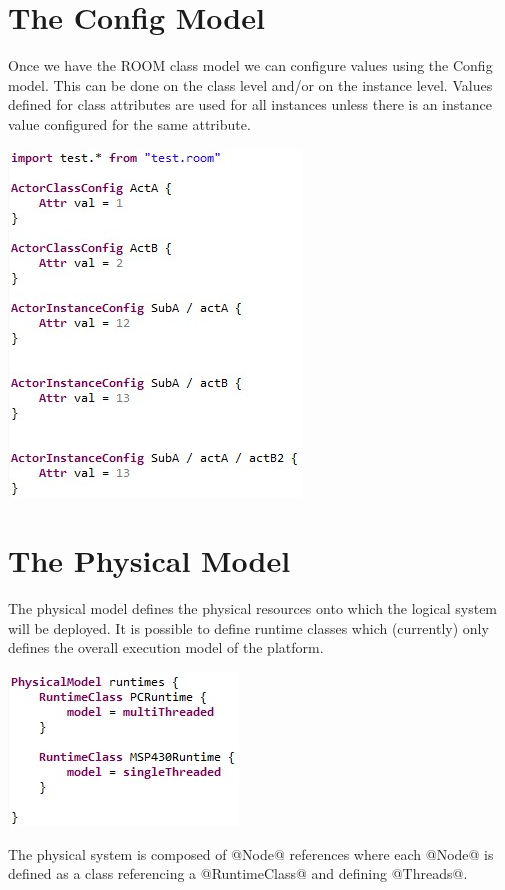 \section{The Config Model}

Once we have the ROOM class model we can configure values using the Config model. This can be done on the 
class level and/or on the instance level. Values defined for class attributes are used for all instances 
unless there is an instance value configured for the same attribute.

\includegraphics{images/080-config.jpg}

\section{The Physical Model}

The physical model defines the physical resources onto which the logical system will be deployed. It is 
possible to define runtime classes which (currently) only defines the overall execution model of the 
platform.

\includegraphics{images/080-runtimes.jpg}

The physical system is composed of @Node@ references where each @Node@ is defined as a class referencing a 
@RuntimeClass@ and defining @Threads@.

